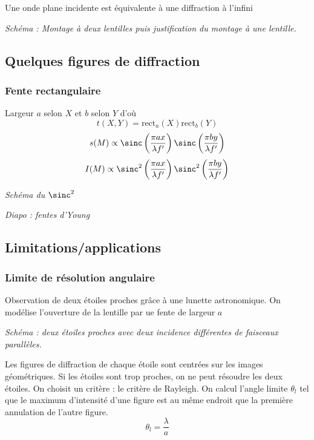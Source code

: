 Une onde plane incidente est équivalente à une diffraction à l'infini

\emph{Schéma : Montage à deux lentilles puis justification du montage à une lentille.}
 
\subsection{Quelques figures de diffraction}

\subsubsection{Fente rectangulaire}

Largeur $a$ selon $X$ et $b$ selon $Y$ d'où
\begin{equation}
t(X,Y) = \mathrm{rect}_a(X) \mathrm{rect}_b(Y)
\end{equation}
\begin{equation}
s(M) \propto \sinc\left(\frac{\pi a x}{\lambda f'}\right) \sinc\left(\frac{\pi b y}{\lambda f'}\right)
\end{equation}
\begin{equation}
I(M) \propto \sinc^2\left(\frac{\pi a x}{\lambda f'}\right) \sinc^2\left(\frac{\pi b y}{\lambda f'}\right)
\end{equation}

\emph{Schéma du $\sinc^2$}

\emph{Diapo : fentes d'Young}

\subsection{Limitations/applications}

\subsubsection{Limite de résolution angulaire}

Observation de deux étoiles proches grâce à une lunette astronomique. On modélise l'ouverture de la lentille par ue fente de largeur $a$

\emph{Schéma : deux étoiles proches avec deux incidence différentes de faisceaux parallèles.}

Les figures de diffraction de chaque étoile sont centrées sur les images géométriques.
Si les étoiles sont trop proches, on ne peut résoudre les deux étoiles.
On choisit un critère : le critère de Rayleigh.
On calcul l'angle limite $\theta_l$ tel que le maximum d'intensité d'une figure est au même endroit que la première annulation de l'autre figure.
\begin{equation}
\theta_l = \frac{\lambda}{a}
\end{equation}

